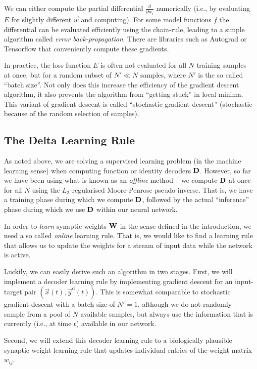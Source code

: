 \documentclass[10pt,letterpaper,oneside]{article}
\begin{document}
We can either compute the partial differential $\frac{\partial}{\partial w_i}$ numerically (i.e., by evaluating $E$ for slightly different $\vec w$ and computing). For some model functions $f$ the differential can be evaluated efficiently using the chain-rule, leading to a simple algorithm called \emph{error back-propagation}. There are libraries such as Autograd or Tensorflow that conveniently compute these gradients.

In practice, the loss function $E$ is often not evaluated for all $N$ training samples at once, but for a random subset of $N' \ll N$ samples, where $N'$ is the so called \enquote{batch size}. Not only does this increase the efficiency of the gradient descent algorithm, it also prevents the algorithm from \enquote{getting stuck} in local minima. This variant of gradient descent is called \enquote{stochastic gradient descent} (stochastic because of the random selection of samples).

\subsection{The Delta Learning Rule}

As noted above, we are solving a supervised learning problem (in the machine learning sense) when computing function or identity decoders ${\mathbf{D}}$. However, so far we have been using what is known as an \emph{offline} method -- we compute ${\mathbf{D}}$ at once for all $N$ using the $L_2$-regularised Moore-Penrose pseudo inverse. That is, we have a training phase during which we compute ${\mathbf{D}}$, followed by the actual \enquote{inference} phase during which we use ${\mathbf{D}}$ within our neural network.

In order to \emph{learn} synaptic weights ${\mathbf{W}}$ in the sense defined in the introduction, we need a so called \emph{online} learning rule. That is, we would like to find a learning rule that allows us to update the weights for a stream of input data while the network is active.

Luckily, we can easily derive such an algorithm in two stages. First, we will implement a decoder learning rule by implementing gradient descent for an input-target pair $(\vec x(t), \vec y^\mathrm{d}(t))$. This is somewhat comparable to stochastic gradient descent with a batch size of $N' = 1$, although we do not randomly sample from a pool of $N$ available samples, but always use the information that is currently (i.e., at time $t$) available in our network.

Second, we will extend this decoder learning rule to a biologically plausible synaptic weight learning rule that updates individual entries of the weight matrix $w_{ij}$.
\end{document}
